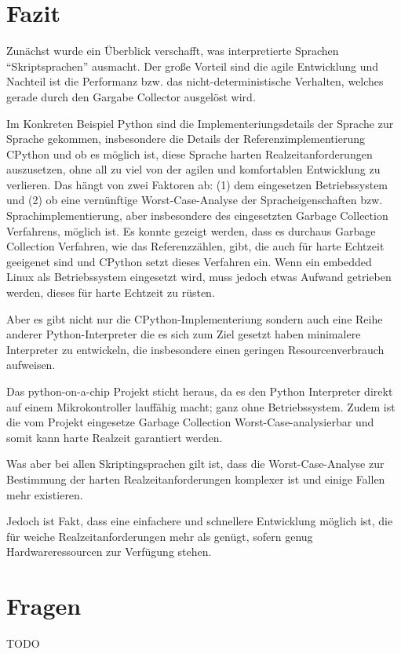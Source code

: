 \section{Fazit}


Zunächst wurde ein Überblick verschafft, was interpretierte Sprachen
“Skriptsprachen” ausmacht. Der große Vorteil sind die agile Entwicklung und
Nachteil ist die Performanz bzw. das nicht-deterministische Verhalten, welches
gerade durch den Gargabe Collector ausgelöst wird.

Im Konkreten Beispiel Python sind die Implementeriungsdetails der Sprache zur
Sprache gekommen, insbesondere die Details der Referenzimplementierung CPython
und ob es möglich ist, diese Sprache harten Realzeitanforderungen auszusetzen,
ohne all zu viel von der agilen und komfortablen Entwicklung zu verlieren.
Das hängt von zwei Faktoren ab: (1) dem eingesetzen Betriebssystem und (2) ob
eine vernünftige Worst-Case-Analyse der Spracheigenschaften bzw.
Sprachimplementierung, aber insbesondere des eingesetzten Garbage Collection
Verfahrens, möglich ist. Es konnte gezeigt werden, dass es durchaus Garbage Collection
Verfahren, wie das Referenzzählen, gibt, die auch für harte Echtzeit geeigenet
sind und CPython setzt dieses Verfahren ein. Wenn ein embedded Linux als
Betriebssystem eingesetzt wird, muss jedoch etwas Aufwand getrieben werden,
dieses für harte Echtzeit zu rüsten.

Aber es gibt nicht nur die CPython-Implementeriung sondern auch eine Reihe
anderer Python-Interpreter die es sich zum Ziel gesetzt haben minimalere
Interpreter zu entwickeln, die insbesondere einen geringen Resourcenverbrauch
aufweisen.

Das python-on-a-chip Projekt sticht heraus, da es den Python Interpreter
direkt auf einem Mikrokontroller lauffähig macht; ganz ohne Betriebssystem.
Zudem ist die vom Projekt eingesetze Garbage Collection
Worst-Case-analysierbar und somit kann harte Realzeit garantiert werden.

Was aber bei allen Skriptingsprachen gilt ist, dass die Worst-Case-Analyse
zur Bestimmung der harten Realzeitanforderungen komplexer ist und einige
Fallen mehr existieren.

Jedoch ist Fakt, dass eine einfachere und schnellere Entwicklung möglich ist,
die für weiche Realzeitanforderungen mehr als genügt, sofern genug
Hardware\-ressourcen zur Verfügung stehen.


\section{Fragen}

TODO
